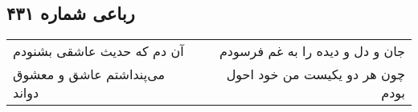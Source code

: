 \begin{center}
\section*{رباعی شماره ۴۳۱}
\label{sec:sh431}
\begin{longtable}{l p{0.5cm} r}
آن دم که حدیث عاشقی بشنودم
&&
جان و دل و دیده را به غم فرسودم
\\
می‌پنداشتم عاشق و معشوق دواند
&&
چون هر دو یکیست من خود احول بودم
\\
\end{longtable}
\end{center}
